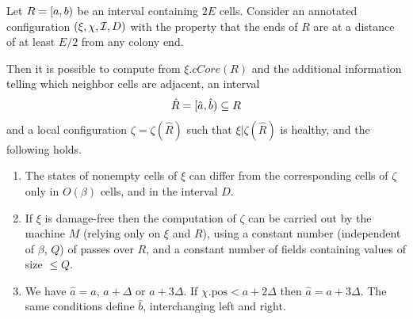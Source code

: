 \documentclass[12pt]{memoir}
\newcommand{\fld}[1]{\ensuremath{\textit{#1}}}
\newcommand{\D}{D}
\newcommand{\E}{E}
\newcommand{\pos}{\mathrm{pos}}
\newcommand{\R}{R}
\newcommand{\cCore}{\fld{cCore}}
\begin{document}
\begin{lemma}[Patching]\label{lem:patching}
    Let  \( \R=\lint{a}{b} \) be an interval containing \( 2\E \) cells.
    Consider an
annotated configuration \(  (\xi, \chi, \cI, \D) \)  with the property that the ends of \( R \) are
at a distance of at least \( \E/2 \) from any colony end.

   Then it is possible to compute from \( \xi.\cCore(\R) \) and the additional information telling
which neighbor cells are adjacent,  an interval
\begin{align*}
   \hat \R =\lint{\hat a}{\hat b} \subseteq \R
 \end{align*}
    and a local configuration \( \zeta = \zeta(\hat \R) \)
    such that \( \xi |\zeta(\hat \R) \) is healthy, and the following holds.

    \begin{enumerate}[\upshape (a)]
     \item
        The states of nonempty cells of \( \xi \) can differ from the corresponding cells
        of \( \zeta \) only in \( O(\beta) \) cells, and in the interval \( \D \).

     \item
        If \( \xi \) is damage-free then the 
        computation of \( \zeta \) can be carried out by the machine \( M \)
        (relying only on \( \xi \) and \( \R \)), using a
        constant number (independent of \( \beta \), \( Q \))
        of passes over \( \R \), and a constant number
        of fields containing values of size \( \le Q \).

     \item\label{i:patching.inside}
       We have \( \hat a = a  \), \( a+\Delta \) or \( a+3\Delta \).
       If \( \chi.\pos < a + 2\Delta\) then \( \hat a = a+3\Delta \).
       The same conditions define \( \hat b \), interchanging left and right.

    \end{enumerate}
\end{lemma}
\end{document}
